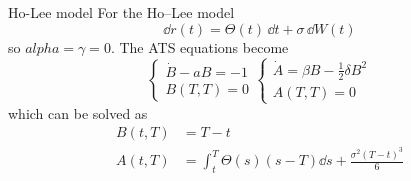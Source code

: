\begin{example}{Ho-Lee model}{}{}
    For the Ho–Lee model
    \begin{equation*}
        \dd r(t) = \Theta(t)\,\dd t + \sigma\,\dd W(t)
    \end{equation*}
    so $alpha = \gamma = 0$. The ATS equations become
    \begin{equation*}
    \begin{cases}
        \dot{B} - aB = -1 \\
        B(T,T) = 0
    \end{cases}
    \begin{cases}
    \dot{A} = \beta B - \frac{1}{2}\delta B^2 \\
    A(T,T) = 0
    \end{cases}
    \end{equation*}
    which can be solved as
    \begin{align*}
        B(t,T) &= T-t \\
        A(t,T) &= \int_t^T \Theta(s)(s-T)\dd s + \frac{\sigma^2(T-t)^3}{6}
    \end{align*}
\end{example} %
